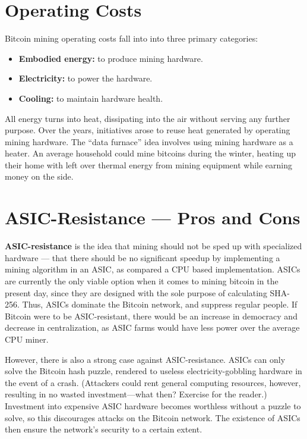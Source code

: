 \documentclass[full.tex]{subfiles}
\begin{document}
    \section*{Operating Costs}
    
     \noindent Bitcoin mining operating costs fall into into three primary categories:
     \begin{itemize}
        \item \textbf{Embodied energy:} to produce mining hardware. 
        \item \textbf{Electricity:} to power the hardware. 
        \item \textbf{Cooling:} to maintain hardware health. 
    \end{itemize}
    
    All energy turns into heat, dissipating into the air without serving any further purpose. Over the years, initiatives arose to reuse heat generated by operating mining hardware. The ``data furnace'' idea involves using mining hardware as a heater. An average household could mine bitcoins during the winter, heating up their home with left over thermal energy from mining equipment while earning money on the side.
    
    \section*{ASIC-Resistance --- Pros and Cons}
    
    \textbf{ASIC-resistance} is the idea that mining should not be sped up with specialized hardware --- that there should be no significant speedup by implementing a mining algorithm in an ASIC, as compared a CPU based implementation. ASICs are currently the only viable option when it comes to mining bitcoin in the present day, since they are designed with the sole purpose of calculating SHA-256. Thus, ASICs dominate the Bitcoin network, and suppress regular people. If Bitcoin were to be ASIC-resistant, there would be an increase in democracy and decrease in centralization, as ASIC farms would have less power over the average CPU miner.
    
    However, there is also a strong case against ASIC-resistance. ASICs can only solve the Bitcoin hash puzzle, rendered to useless electricity-gobbling hardware in the event of a crash. (Attackers could rent general computing resources, however, resulting in no wasted investment---what then? Exercise for the reader.) Investment into expensive ASIC hardware becomes worthless without a puzzle to solve, so this discourages attacks on the Bitcoin network. The existence of ASICs then ensure the network's security to a certain extent.
    
\end{document}
